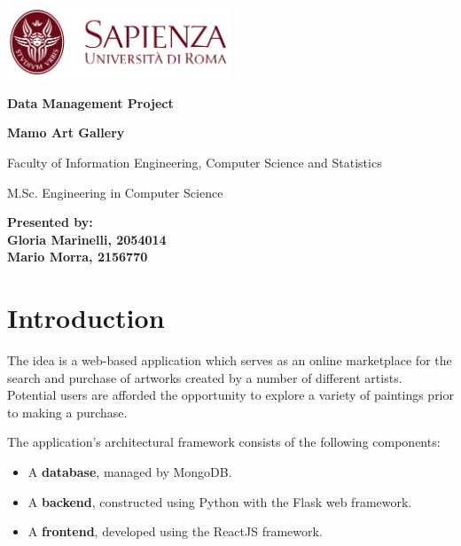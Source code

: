 \documentclass[a4paper,12pt]{article}
\begin{document}
\begin{titlepage}
      \begingroup
      \centering
      \includegraphics[width=0.5\textwidth]{sapienza.png}\par\vspace{1cm}

      {\bfseries\large Data Management Project \par}\vspace{0.5cm}

      {\bfseries\LARGE Mamo Art Gallery \par}\vspace{1cm}

      {\small Faculty of Information Engineering, Computer Science and Statistics
            \par}\vspace{0.1cm}

      {\small
            M.Sc. Engineering in Computer Science
            \par}\vspace{10cm}

      \endgroup

      {\textbf{\small
                  Presented by: \\
                  Gloria Marinelli, 2054014 \\
                  Mario Morra, 2156770}}\vfill

\end{titlepage}

\tableofcontents
\newpage

\section{Introduction}
\justify
The idea is a web-based application which serves as an online marketplace for the search and purchase of artworks created by a number of different artists. Potential users are afforded the opportunity to explore a variety of paintings prior to making a purchase.

The application's architectural framework consists of the following components:

\begin{itemize}
      \item A \textbf{database}, managed by MongoDB.
      \item A \textbf{backend}, constructed using Python with the Flask web framework.
      \item A \textbf{frontend}, developed using the ReactJS framework.
\end{itemize}
\end{document}
